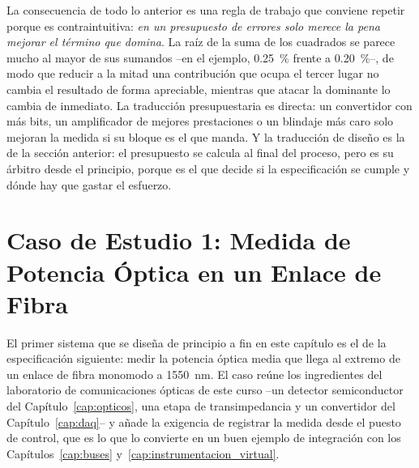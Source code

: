 
La consecuencia de todo lo anterior es una regla de trabajo que conviene repetir porque es contraintuitiva: \emph{en un presupuesto de errores solo merece la pena mejorar el término que domina}. La raíz de la suma de los cuadrados se parece mucho al mayor de sus sumandos --en el ejemplo, \SI{0.25}{\percent} frente a \SI{0.20}{\percent}--, de modo que reducir a la mitad una contribución que ocupa el tercer lugar no cambia el resultado de forma apreciable, mientras que atacar la dominante lo cambia de inmediato. La traducción presupuestaria es directa: un convertidor con más bits, un amplificador de mejores prestaciones o un blindaje más caro solo mejoran la medida si su bloque es el que manda. Y la traducción de diseño es la de la sección anterior: el presupuesto se calcula al final del proceso, pero es su árbitro desde el principio, porque es el que decide si la especificación se cumple y dónde hay que gastar el esfuerzo.

\section{Caso de Estudio 1: Medida de Potencia Óptica en un Enlace de Fibra}\label{sec:caso_fibra}

El primer sistema que se diseña de principio a fin en este capítulo es el de la especificación siguiente: medir la potencia óptica media que llega al extremo de un enlace de fibra monomodo a \SI{1550}{\nano\meter}. El caso reúne los ingredientes del laboratorio de comunicaciones ópticas de este curso --un detector semiconductor del Capítulo~\ref{cap:opticos}, una etapa de transimpedancia y un convertidor del Capítulo~\ref{cap:daq}-- y añade la exigencia de registrar la medida desde el puesto de control, que es lo que lo convierte en un buen ejemplo de integración con los Capítulos~\ref{cap:buses} y~\ref{cap:instrumentacion_virtual}.

